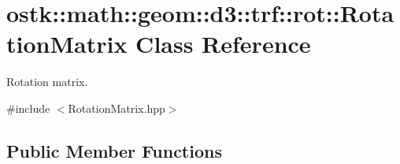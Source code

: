 \hypertarget{classostk_1_1math_1_1geom_1_1d3_1_1trf_1_1rot_1_1_rotation_matrix}{}\section{ostk\+:\+:math\+:\+:geom\+:\+:d3\+:\+:trf\+:\+:rot\+:\+:Rotation\+Matrix Class Reference}
\label{classostk_1_1math_1_1geom_1_1d3_1_1trf_1_1rot_1_1_rotation_matrix}


Rotation matrix.  




{\ttfamily \#include $<$Rotation\+Matrix.\+hpp$>$}

\subsection*{Public Member Functions}
